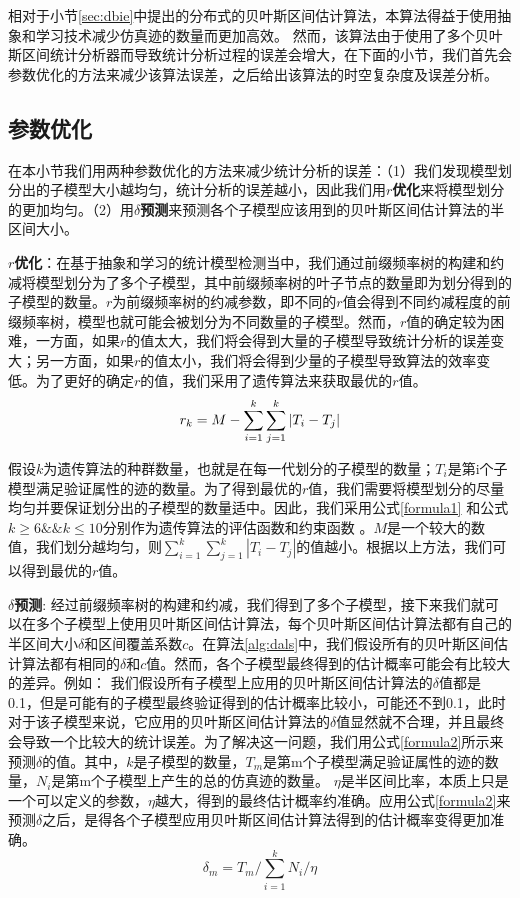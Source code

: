 相对于小节\ref{sec:dbie}中提出的分布式的贝叶斯区间估计算法，本算法得益于使用抽象和学习技术减少仿真迹的数量而更加高效。 然而，该算法由于使用了多个贝叶斯区间统计分析器而导致统计分析过程的误差会增大，在下面的小节，我们首先会参数优化的方法来减少该算法误差，之后给出该算法的时空复杂度及误差分析。

\subsection{参数优化}
\label{sec:opt}
在本小节我们用两种参数优化的方法来减少统计分析的误差：（1）我们发现模型划分出的子模型大小越均匀，统计分析的误差越小，因此我们用\textbf{$r$优化}来将模型划分的更加均匀。（2）用\textbf{$\delta$预测}来预测各个子模型应该用到的贝叶斯区间估计算法的半区间大小。

\textbf{$r$优化}：在基于抽象和学习的统计模型检测当中，我们通过前缀频率树的构建和约减将模型划分为了多个子模型，其中前缀频率树的叶子节点的数量即为划分得到的子模型的数量。$r$为前缀频率树的约减参数，即不同的$r$值会得到不同约减程度的前缀频率树，模型也就可能会被划分为不同数量的子模型。然而，$r$值的确定较为困难，一方面，如果$r$的值太大，我们将会得到大量的子模型导致统计分析的误差变大；另一方面，如果$r$的值太小，我们将会得到少量的子模型导致算法的效率变低。为了更好的确定$r$的值，我们采用了遗传算法\cite{DBLP:books/daglib/0019871}来获取最优的$r$值。 
\begin{equation}
\centering
\label{formula1}
r_k = M - \sum\limits_{i=1}^k \sum\limits_{j=1}^k |T_i - T_j| 
\end{equation}

假设$k$为遗传算法的种群数量，也就是在每一代划分的子模型的数量；$T_i$是第i个子模型满足验证属性的迹的数量。为了得到最优的$r$值，我们需要将模型划分的尽量均匀并要保证划分出的子模型的数量适中。因此，我们采用公式\ref{formula1} 和公式$k \geq 6 \&\& k \leq 10$分别作为遗传算法的评估函数和约束函数 。$M$是一个较大的数值，我们划分越均匀，则$\sum\limits_{i=1}^k \sum\limits_{j=1}^k |T_i - T_j|$的值越小。根据以上方法，我们可以得到最优的$r$值。

\textbf{$\delta$预测}:
经过前缀频率树的构建和约减，我们得到了多个子模型，接下来我们就可以在多个子模型上使用贝叶斯区间估计算法，每个贝叶斯区间估计算法都有自己的半区间大小$\delta$和区间覆盖系数$c$。在算法\ref{alg:dals}中，我们假设所有的贝叶斯区间估计算法都有相同的$\delta$和$c$值。然而，各个子模型最终得到的估计概率可能会有比较大的差异。例如： 我们假设所有子模型上应用的贝叶斯区间估计算法的$\delta$值都是0.1，但是可能有的子模型最终验证得到的估计概率比较小，可能还不到0.1，此时对于该子模型来说，它应用的贝叶斯区间估计算法的$\delta$值显然就不合理，并且最终会导致一个比较大的统计误差。为了解决这一问题，我们用公式\ref{formula2}所示来预测$\delta$的值。其中，$k$是子模型的数量，$T_m$是第m个子模型满足验证属性的迹的数量，$N_i$是第m个子模型上产生的总的仿真迹的数量。 $\eta$是半区间比率，本质上只是一个可以定义的参数，$\eta$越大，得到的最终估计概率约准确。应用公式\ref{formula2}来预测$\delta$之后，是得各个子模型应用贝叶斯区间估计算法得到的估计概率变得更加准确。
\begin{equation}
\label{formula2}
\delta_m = T_m / \sum\limits_{i=1}^k N_i / \eta
\end{equation}
